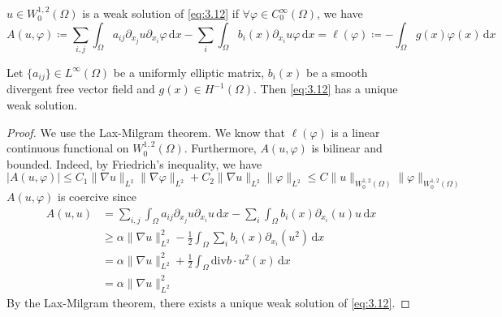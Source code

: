 \documentclass{report}
\begin{document}
\begin{definition}{}{}
    \(u \in W^{1, 2}_{0}(\Omega)\) is a weak solution of \ref{eq:3.12} if \(\forall \varphi \in C^{\infty}_{0}(\Omega)\), we have 
    \[
        A(u, \varphi) \coloneqq \sum_{i, j} \int_{\Omega} a_{ij} \partial_{x_{j}}u \partial_{x_{i}}\varphi \,\mathrm{d}x - \sum_{i} \int_{\Omega} b_{i}(x) \partial_{x_{i}} u \varphi \,\mathrm{d}x = \ell(\varphi) \coloneqq - \int_{\Omega} g(x)\varphi(x) \,\mathrm{d}x
    \]
\end{definition}

\begin{theorem}{}{}
    Let \(\{a_{ij}\} \in L^{\infty}(\Omega)\) be a uniformly elliptic matrix, \(b_{i}(x)\) be a smooth divergent free vector field and \(g(x) \in H^{-1}(\Omega)\). Then \ref{eq:3.12} has a unique weak solution.
\end{theorem}

\begin{proof}
    We use the Lax-Milgram theorem. We know that \(\ell(\varphi)\) is a linear continuous functional on \(W^{1, 2}_{0}(\Omega)\). Furthermore, \(A(u, \varphi)\) is bilinear and bounded. Indeed, by Friedrich's inequality, we have
    \[
        \vert A(u, \varphi) \vert \leq C_{1}\|\nabla u\|_{L^{2}} \|\nabla \varphi\|_{L^{2}} + C_2\|\nabla u\|_{L^{2}}\|\varphi\|_{L^{2}} \leq C\|u\|_{W^{1, 2}_{0}(\Omega)}\|\varphi\|_{W^{1, 2}_{0}(\Omega)}
    \]
    \(A(u, \varphi)\) is coercive since 
    \begin{align*}
        A(u, u) &= \sum_{i, j} \int_{\Omega} a_{ij} \partial_{x_{j}}u \partial_{x_{i}}u \,\mathrm{d}x - \sum_{i} \int_{\Omega} b_{i}(x) \partial_{x_{i}} (u) u \,\mathrm{d}x \\
        &\geq \alpha \|\nabla u\|_{L^{2}}^{2} - \frac{1}{2}\int_{\Omega} \sum_{i} b_{i}(x) \partial_{x_{i}} (u^{2}) \,\mathrm{d}x \\
        &= \alpha \|\nabla u\|_{L^{2}}^{2} + \frac{1}{2} \int_{\Omega} \text{div}b \cdot u^{2}(x) \,\mathrm{d}x \\
        &= \alpha\|\nabla u\|_{L^{2}}^{2}
    \end{align*}
    By the Lax-Milgram theorem, there exists a unique weak solution of \ref{eq:3.12}.
\end{proof}
\end{document}
